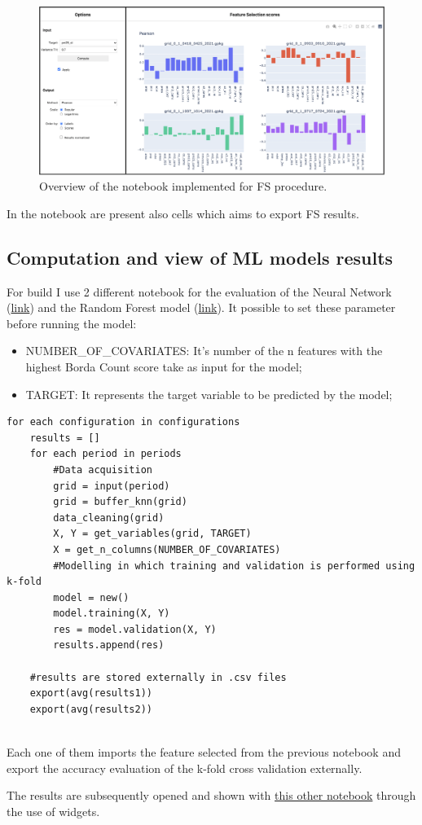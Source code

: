 \begin{figure}[H]
    \centering
    \includegraphics[scale=0.40]{images/notebook.png}
    \caption{Overview of the notebook implemented for FS procedure.}
    \label{fig:notebook}
\end{figure}

In the notebook are present also cells which aims to export FS results.

\subsection{Computation and view of ML models results}
For build I use 2 different notebook for the evaluation of the Neural Network (\href{https://github.com/opengeolab/D-DUST/blob/thesis_MB/notebooks/Keras_prediction_model.ipynb}{link}) and the Random Forest model (\href{https://github.com/opengeolab/D-DUST/blob/thesis_MB/notebooks/RandomForest_prediction_model.ipynb}{link}). 
It possible to set these parameter before running the model:
\begin{itemize}
    \item NUMBER\_OF\_COVARIATES: It's number of the n features with the highest Borda Count score take as input for the model;
    \item TARGET: It represents the target variable to be predicted by the model;
\end{itemize}
\begin{verbatim}
for each configuration in configurations
    results = []
    for each period in periods
        #Data acquisition
        grid = input(period)
        grid = buffer_knn(grid)
        data_cleaning(grid)
        X, Y = get_variables(grid, TARGET)
        X = get_n_columns(NUMBER_OF_COVARIATES)
        #Modelling in which training and validation is performed using k-fold
        model = new()
        model.training(X, Y)
        res = model.validation(X, Y)
        results.append(res)
    
    #results are stored externally in .csv files
    export(avg(results1))
    export(avg(results2))
 
\end{verbatim}

Each one of them imports the feature selected from the previous notebook and export the accuracy evaluation of the k-fold cross validation externally. \par
The results are subsequently opened and shown with \href{https://github.com/opengeolab/D-DUST/blob/thesis_MB/notebooks/model.ipynb}{this other notebook} through the use of widgets.
